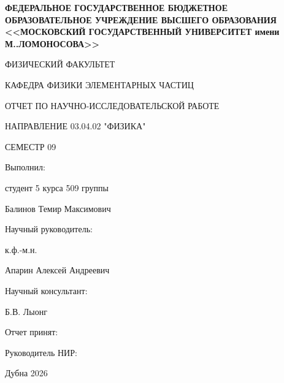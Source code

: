 \documentclass{extarticle}
\begin{document}
    \begin{titlepage}
        \newpage
        \begin{center}
        
            \bfseries ФЕДЕРАЛЬНОЕ ГОСУДАРСТВЕННОЕ БЮДЖЕТНОЕ ОБРАЗОВАТЕЛЬНОЕ УЧРЕЖДЕНИЕ ВЫСШЕГО ОБРАЗОВАНИЯ <<МОСКОВСКИЙ ГОСУДАРСТВЕННЫЙ УНИВЕРСИТЕТ имени М..\@ ЛОМОНОСОВА>>
            
            \vspace{1cm}
            ФИЗИЧЕСКИЙ ФАКУЛЬТЕТ
            \vspace{1cm}
        
            КАФЕДРА ФИЗИКИ ЭЛЕМЕНТАРНЫХ ЧАСТИЦ
        
            \vspace{6cm}
            ОТЧЕТ ПО НАУЧНО-ИССЛЕДОВАТЕЛЬСКОЙ РАБОТЕ 
            
            НАПРАВЛЕНИЕ 03.04.02 "ФИЗИКА"
            
            СЕМЕСТР 09
        \end{center}

        \vspace{4cm}

        \begin{flushright}
            Выполнил:
            
            студент 5 курса 509 группы
            
            Балинов Темир Максимович
        \end{flushright}
        
        \vspace{0.5cm}

        \begin{flushright}
            Научный руководитель:
            
            к.ф.-м.н.
            
            Апарин Алексей Андреевич

            Научный консультант:
            
            Б.В. Лыонг
        \end{flushright}

        \vspace{\fill}

        \begin{flushleft}
            Отчет принят: 

            \vspace{0.5cm}

            Руководитель НИР:
        \end{flushleft}
        
        \begin{center}
            Дубна 2026
        \end{center}

    \end{titlepage}
\end{document}
